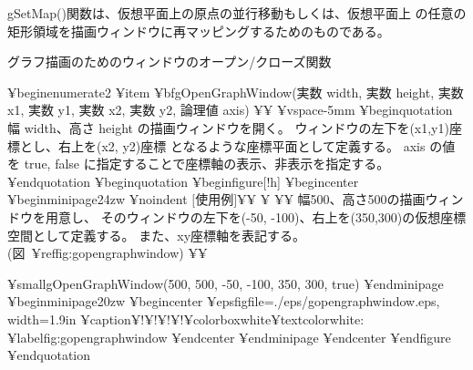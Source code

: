 gSetMap()関数は、仮想平面上の原点の並行移動もしくは、仮想平面上
の任意の矩形領域を描画ウィンドウに再マッピングするためのものである。

%
%

グラフ描画のためのウィンドウのオープン/クローズ関数 

¥begin{enumerate2}
¥item {¥bf{gOpenGraphWindow(実数 width, 実数 height, 実数 x1, 実数 y1, 実数 x2, 実数 y2, 論理値 axis)}} ¥¥
¥vspace{-5mm}
   ¥begin{quotation}
   幅 width、高さ height の描画ウィンドウを開く。
   ウィンドウの左下を(x1,y1)座標とし、右上を(x2, y2)座標
   となるような座標平面として定義する。
   axis の値を true, false に指定することで座標軸の表示、非表示を指定する。
   ¥end{quotation}
   ¥begin{quotation}
¥begin{figure}[!h]
¥begin{center}
¥begin{minipage}{24zw}
	   ¥noindent $[$使用例$]$¥¥
¥ ¥¥
幅500、高さ500の描画ウィンドウを用意し、
そのウィンドウの左下を(-50, -100)、右上を(350,300)の仮想座標空間として定義する。
また、xy座標軸を表記する。(図~¥ref{fig:gopengraphwindow}) ¥¥

{¥small{gOpenGraphWindow(500, 500, -50, -100, 350, 300, true)}}
¥end{minipage}
¥begin{minipage}{20zw}
¥begin{center}
¥epsfig{file=./eps/gopengraphwindow.eps, width=1.9in}
¥caption{$¥!¥!¥!¥!$¥colorbox{white}{{¥textcolor{white}{:}}}}
¥label{fig:gopengraphwindow}
¥end{center}
¥end{minipage}
¥end{center}
¥end{figure}
   ¥end{quotation}


